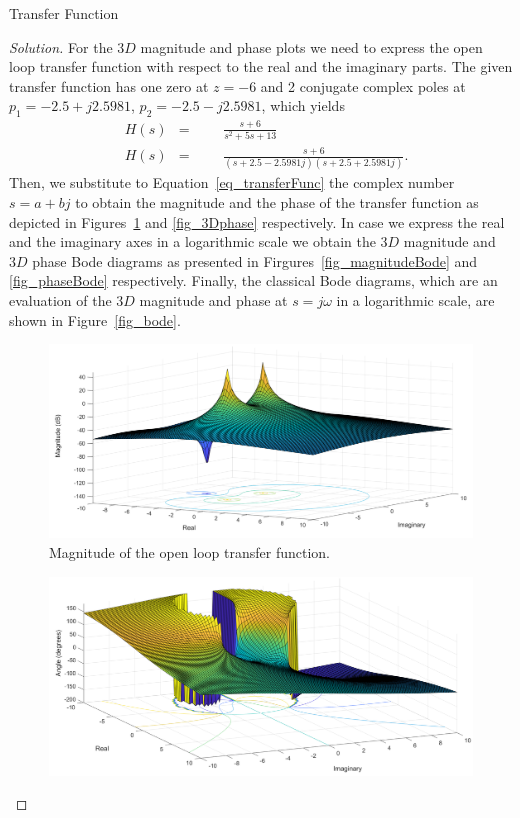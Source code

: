 \documentclass[12pt]{article}
\newenvironment{problem}[2][Problem]{\begin{trivlist}
\item[\hskip \labelsep {\bfseries #1}\hskip \labelsep {\bfseries #2.}]}{\end{trivlist}}
\newenvironment{solution}{\begin{proof}[Solution]}{\end{proof}}
\begin{document}
\begin{problem}{1.4} %
Transfer Function
\end{problem}
\begin{solution}
For the $3D$ magnitude and phase plots we need to express the open loop transfer function with respect to the real and the imaginary parts. The given transfer function has one zero at $z=-6$ and 2 conjugate complex poles at $p_1=-2.5+j2.5981$, $p_2=-2.5-j2.5981$, which yields
\begin{equation}\label{eq_transferFunc}
\begin{aligned}
& H(s)
& =
&&& \frac{s+6}{s^2+5s+13}\\
& H(s)
& =
&&& \frac{s+6}{(s+2.5-2.5981j)(s+2.5+2.5981j)}.
\end{aligned}
\end{equation}
Then, we substitute to Equation~\ref{eq_transferFunc} the complex number $s=a+bj$ to obtain the magnitude and the phase of the transfer function as depicted in Figures~\ref{fig_3Dmagnitude} and \ref{fig_3Dphase} respectively. In case we express the real and the imaginary axes in a logarithmic scale we obtain the $3D$ magnitude and $3D$ phase Bode diagrams as presented in Firgures~\ref{fig_magnitudeBode} and \ref{fig_phaseBode} respectively. Finally, the classical Bode diagrams, which are an evaluation of the $3D$ magnitude and phase at $s=j\omega$ in a logarithmic scale, are shown in Figure~\ref{fig_bode}.
\begin{figure}[!h]
	\includegraphics[width=.8\columnwidth]{figures/1_4_magnitude.png}
	\centering
	\caption{Magnitude of the open loop transfer function.}
	\label{fig_3Dmagnitude}
\end{figure}
\begin{figure}[!h]
	\includegraphics[width=.8\columnwidth]{figures/1_4_phase.png}

\end{figure}
\end{solution}
\end{document}
